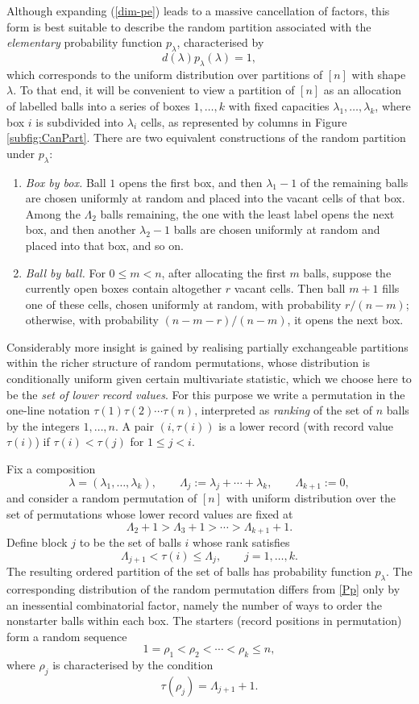 \documentclass{article}
\begin{document}
Although expanding (\ref{dim-pe}) leads to a massive cancellation of factors, this form is best suitable 
to describe the random partition associated with the {\it elementary} probability function $p_\lambda$, characterised by
\[
d(\lambda)p_\lambda(\lambda)=1,
\]
which corresponds to the uniform distribution over partitions of $[n]$ with shape $\lambda$.
To that end, it will be convenient to view a partition of $[n]$ as an allocation of labelled balls into a series of boxes $1,\ldots,k$ with fixed capacities $\lambda_1,\ldots,\lambda_k$,
where box $i$ is subdivided into $\lambda_i$ cells, as represented by columns in Figure \ref{subfig:CanPart}.
There are two equivalent constructions of the random partition under $p_\lambda$:
\begin{enumerate}
\item[(i)] {\it Box by box.}
Ball $1$ opens the first box, and then $\lambda_1-1$ of the remaining balls are chosen uniformly at random and placed into the vacant cells of that box.
Among the $\Lambda_2$ balls remaining, the one with the least label opens the next box, and then another $\lambda_2-1$ balls are chosen uniformly at random and placed into that box, and so on.

\item[(ii)] {\it Ball by ball.}
For $0\le m<n$, after allocating the first $m$ balls, suppose the currently open boxes contain altogether $r$ vacant cells.
Then ball $m+1$ fills one of these cells, chosen uniformly at random, with probability $r/(n-m)$;
otherwise, with probability $(n-m-r)/(n-m)$, it opens the next box.
\end{enumerate}


Considerably more insight is gained by realising partially exchangeable partitions
within the richer structure of random permutations, whose distribution is
conditionally uniform given certain multivariate statistic, which we choose here to be 
 the {\it set of lower record values}.
For this purpose we write a permutation in the one-line notation
$\tau(1)\tau(2)\cdots\tau(n)$,
interpreted as  {\it ranking} of the set of $n$ balls by the integers $1,\ldots,n$.
A pair $(i,\tau(i))$ is a lower record (with record value $\tau(i)$) if
$\tau(i)<\tau(j)$ for $1\le j<i$.


Fix a composition
\[
\lambda=(\lambda_1,\ldots,\lambda_k),
\qquad
\Lambda_j:=\lambda_j+\cdots+\lambda_k,
\qquad
\Lambda_{k+1}:=0,
\]
and consider a random permutation of $[n]$ with uniform distribution over the set
of permutations whose lower record values are fixed at
\[
\Lambda_2+1>\Lambda_3+1>\cdots>\Lambda_{k+1}+1.
\]
Define block $j$ to be the set of balls $i$ whose rank satisfies
\[
\Lambda_{j+1}<\tau(i)\le \Lambda_j,
\qquad j=1,\ldots,k.
\]
The resulting ordered partition of the set of balls has probability function $p_\lambda$.
The corresponding distribution of the random permutation differs from \eqref{Pp}
only by an inessential combinatorial factor, namely the number of ways to order
the nonstarter balls within each box.
The starters (record positions in permutation) form a random sequence
\[
1=\rho_1<\rho_2<\cdots<\rho_k\le n,
\]
where $\rho_j$ is characterised by the condition
\[
\tau(\rho_j)=\Lambda_{j+1}+1.
\]
\end{document}
